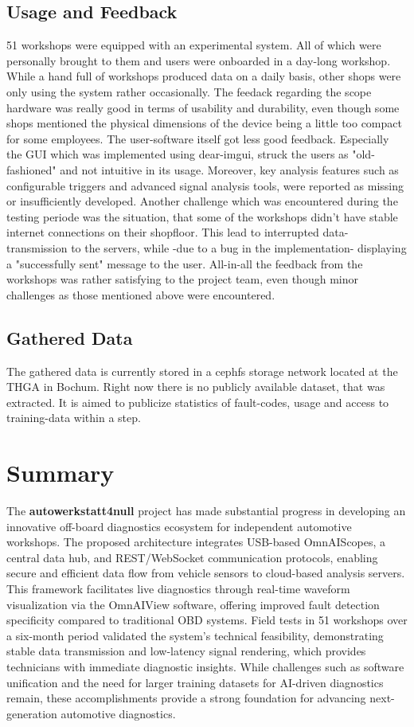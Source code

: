 \subsection{Usage and Feedback}
51 workshops were equipped with an experimental system.
All of which were personally brought to them and users were onboarded in a day-long workshop.
While a hand full of workshops produced data on a daily basis, other shops were only using the system rather occasionally. 
The feedack regarding the scope hardware was really good in terms of usability and durability, even though some shops mentioned the physical dimensions of the device being a little too compact for some employees.
The user-software itself got less good feedback. 
Especially the GUI which was implemented using dear-imgui, struck the users as "old-fashioned" and not intuitive in its usage.
Moreover, key analysis features such as configurable triggers and advanced signal analysis tools, were reported as missing or insufficiently developed.
Another challenge which was encountered during the testing periode was the situation, that some of the workshops didn't have stable internet connections on their shopfloor.
This lead to interrupted data-transmission to the servers, while -due to a bug in the implementation- displaying a "successfully sent" message to the user.
All-in-all the feedback from the workshops was rather satisfying to the project team, even though minor challenges as those mentioned above were encountered.

\subsection{Gathered Data}
The gathered data is currently stored in a cephfs storage network located at the THGA in Bochum.
Right now there is no publicly available dataset, that was extracted.
It is aimed to publicize statistics of fault-codes, usage and access to training-data within a step. 

\section{Summary}
The \textbf{autowerkstatt4null} project has made substantial progress in developing an innovative off-board diagnostics ecosystem for independent automotive workshops. 
The proposed architecture integrates USB-based OmnAIScopes, a central data hub, and REST/WebSocket communication protocols, 
enabling secure and efficient data flow from vehicle sensors to cloud-based analysis servers. 
This framework facilitates live diagnostics through real-time waveform visualization via the OmnAIView software, 
offering improved fault detection specificity compared to traditional OBD systems. 
Field tests in 51 workshops over a six-month period validated the system's technical feasibility, 
demonstrating stable data transmission and low-latency signal rendering, which provides technicians with immediate diagnostic insights. 
While challenges such as software unification and the need for larger training datasets for AI-driven diagnostics remain, 
these accomplishments provide a strong foundation for advancing next-generation automotive diagnostics.

